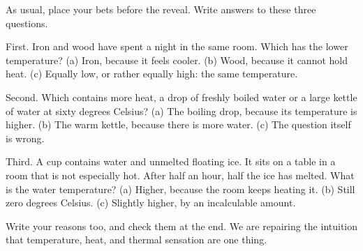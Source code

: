 
As usual, place your bets before the reveal. Write answers to these three questions.

First. Iron and wood have spent a night in the same room. Which has the lower temperature? (a) Iron, because it feels cooler. (b) Wood, because it cannot hold heat. (c) Equally low, or rather equally high: the same temperature.

Second. Which contains more heat, a drop of freshly boiled water or a large kettle of water at sixty degrees Celsius? (a) The boiling drop, because its temperature is higher. (b) The warm kettle, because there is more water. (c) The question itself is wrong.

Third. A cup contains water and unmelted floating ice. It sits on a table in a room that is not especially hot. After half an hour, half the ice has melted. What is the water temperature? (a) Higher, because the room keeps heating it. (b) Still zero degrees Celsius. (c) Slightly higher, by an incalculable amount.

Write your reasons too, and check them at the end. We are repairing the intuition that temperature, heat, and thermal sensation are one thing.


